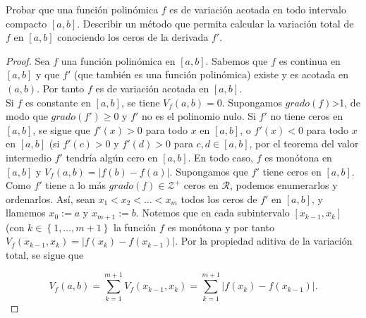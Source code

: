 \setcounter{section}{6}
\setcounter{exercise}{2}
\begin{exercise}

  Probar que una función polinómica $f$ es de variación acotada en todo intervalo compacto $\left[a,b\right]$. Describir un método que permita calcular la variación total de $f$ en $\left[a,b\right]$ conociendo los ceros de la derivada $f'$.

\end{exercise}

\begin{proof}

Sea $f$ una función polinómica en $\left[a,b\right]$. Sabemos que $f$ es continua en $\left[a,b\right]$ y que $f'$ (que también es una función polinómica) existe y es acotada en $\left(a,b\right)$. Por tanto $f$ es de variación acotada en $\left[a,b\right]$.\\
Si $f$ es constante en $\left[a,b\right]$, se tiene $V_f\left(a,b\right)=0$. Supongamos $grado\left(f\right)$>1, de modo que $grado\left(f'\right)\geq 0$ y $f'$ no es el polinomio nulo. Si $f'$ no tiene ceros en $\left[a,b\right]$, se sigue que $f'\left(x\right)>0$ para todo $x$ en $\left[a,b\right]$, o $f'\left(x\right)<0$ para todo $x$ en $\left[a,b\right]$ (si $f'\left(c\right)>0$ y $f'\left(d\right)>0$ para $c,d\in \left[a,b\right]$, por el teorema del valor intermedio $f'$ tendría algún cero en $\left[a,b\right]$. En todo caso, $f$ es monótona en $\left[a,b\right]$ y $V_f\left(a,b\right)=|f\left(b\right)-f\left(a\right)|$. Supongamos que $f'$ tiene ceros en $\left[a,b\right]$. Como $f'$ tiene a lo más $grado\left(f\right)\in \mathcal{Z}^{+}$ ceros en $\mathcal{R}$, podemos enumerarlos y ordenarlos. Así, sean $x_1<x_2<\dots<x_m$ todos los ceros de $f'$ en $\left[a,b\right]$, y llamemos $x_0:=a$ y $x_{m+1}:=b$. Notemos que en cada subintervalo $\left[x_{k-1},x_k\right]$ (con $k\in \left\lbrace 1,\dots, m+1 \right\rbrace$ la función $f$ es monótona y por tanto $V_f\left(x_{k-1},x_k\right)=|f\left(x_k\right)-f\left(x_{k-1}\right)|$. Por la propiedad aditiva de la variación total, se sigue que

\begin{equation*}
  V_f\left(a,b\right)=\sum_{k=1}^{m+1}V_f\left(x_{k-1},x_k\right)=\sum_{k=1}^{m+1}|f\left(x_k\right)-f\left(x_{k-1}\right)|.
\end{equation*}

\end{proof}
